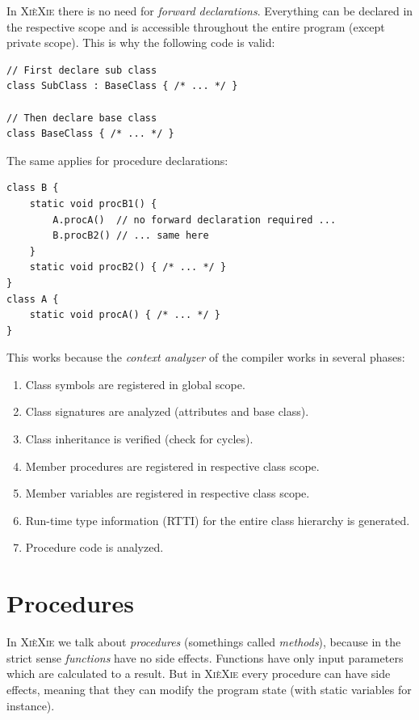 \documentclass[a5paper]{report}
\def\xiexie{\textsc{Xi\`eXie}\xspace}
\begin{document}
In \xiexie there is no need for \textit{forward declarations}. Everything can be declared in the respective scope
and is accessible throughout the entire program (except private scope). This is why the following code is valid:
\begin{lstlisting}
// First declare sub class
class SubClass : BaseClass { /* ... */ }

// Then declare base class
class BaseClass { /* ... */ }
\end{lstlisting}
The same applies for procedure declarations:
\begin{lstlisting}
class B {
    static void procB1() {
        A.procA()  // no forward declaration required ...
        B.procB2() // ... same here
    }
    static void procB2() { /* ... */ }
}
class A {
    static void procA() { /* ... */ }
}
\end{lstlisting}
This works because the \textit{context analyzer} of the compiler works in several phases:
\begin{enumerate}
	\item Class symbols are registered in global scope.
	\item Class signatures are analyzed (attributes and base class).
	\item Class inheritance is verified (check for cycles).
	\item Member procedures are registered in respective class scope.
	\item Member variables are registered in respective class scope.
	\item Run-time type information (RTTI) for the entire class hierarchy is generated.
	\item Procedure code is analyzed.
\end{enumerate}



\section{Procedures}

In \xiexie we talk about \textit{procedures} (somethings called \textit{methods}),
because in the strict sense \textit{functions} have no side effects.
Functions have only input parameters which are calculated to a result. But in \xiexie every procedure can have side effects,
meaning that they can modify the program state (with static variables for instance).
\end{document}
